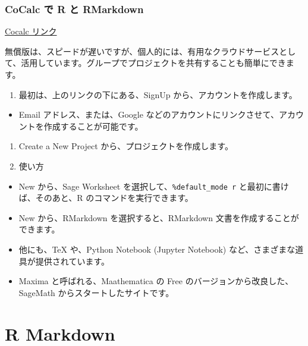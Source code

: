\documentclass[
  xelatex, ja=standard]{bxjsbook}
\providecommand{\tightlist}{%
  \setlength{\itemsep}{0pt}\setlength{\parskip}{0pt}}
\theoremstyle{definition}
\theoremstyle{definition}
\theoremstyle{definition}
\theoremstyle{definition}
\theoremstyle{remark}
\begin{document}
\hypertarget{cocalc-ux3067-r-ux3068-rmarkdown}{%
\subsection{CoCalc で R と RMarkdown}\label{cocalc-ux3067-r-ux3068-rmarkdown}}

\href{https://cocalc.com}{Cocalc リンク}

無償版は、スピードが遅いですが、個人的には、有用なクラウドサービスとして、活用しています。グループでプロジェクトを共有することも簡単にできます。

\begin{enumerate}
\def\labelenumi{\arabic{enumi}.}
\tightlist
\item
  最初は、上のリンクの下にある、SignUp から、アカウントを作成します。
\end{enumerate}

\begin{itemize}
\tightlist
\item
  Email アドレス、または、Google などのアカウントにリンクさせて、アカウントを作成することが可能です。
\end{itemize}

\begin{enumerate}
\def\labelenumi{\arabic{enumi}.}
\setcounter{enumi}{1}
\tightlist
\item
  Create a New Project から、プロジェクトを作成します。
\item
  使い方
\end{enumerate}

\begin{itemize}
\tightlist
\item
  New から、Sage Worksheet を選択して、\texttt{\%default\_mode\ r} と最初に書けば、そのあと、R のコマンドを実行できます。
\item
  New から、RMarkdown を選択すると、RMarkdown 文書を作成することができます。
\item
  他にも、TeX や、Python Notebook (Jupyter Notebook) など、さまざまな道具が提供されています。
\item
  Maxima と呼ばれる、Maathematica の Free のバージョンから改良した、SageMath からスタートしたサイトです。
\end{itemize}

\hypertarget{rmarkdown}{%
\chapter{R Markdown}\label{rmarkdown}}
\end{document}
